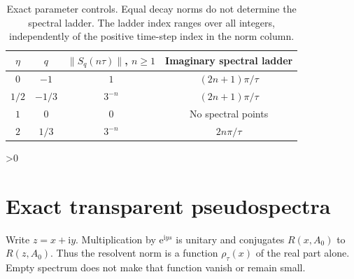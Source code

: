 \documentclass[10pt]{article}
\newcommand{\ii}{\mathrm i}
\newcommand{\e}{\mathrm e}
\begin{document}
\begin{table}[ht]
\centering
\begin{tabular}{cccc}
\toprule
$\eta$ & $q$ & $\|S_q(n\tau)\|$, $n\geq1$ & Imaginary spectral ladder\\
\midrule
$0$ & $-1$ & $1$ & $(2n+1)\pi/\tau$\\
$1/2$ & $-1/3$ & $3^{-n}$ & $(2n+1)\pi/\tau$\\
$1$ & $0$ & $0$ & No spectral points\\
$2$ & $1/3$ & $3^{-n}$ & $2n\pi/\tau$\\
\bottomrule
\end{tabular}
\caption{Exact parameter controls. Equal decay norms do not determine the
spectral ladder. The ladder index ranges over all integers, independently
of the positive time-step index in the norm column.}
\end{table}

\ifnum\CRevisionRound>0
\section{Exact transparent pseudospectra}
Write $z=x+\ii y$. Multiplication by $\e^{\ii ys}$ is unitary and
conjugates $R(x,A_0)$ to $R(z,A_0)$. Thus the resolvent norm is a function
$\rho_\tau(x)$ of the real part alone. Empty spectrum does not make that
function vanish or remain small.
\end{document}
